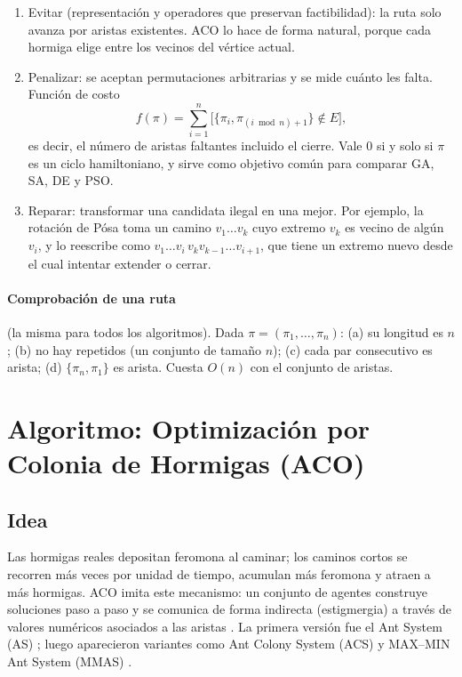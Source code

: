 \begin{enumerate}
  \item Evitar (representación y operadores que preservan factibilidad): la ruta
        solo avanza por aristas existentes. ACO lo hace de forma natural, porque cada
        hormiga elige entre los vecinos del vértice actual.
  \item Penalizar: se aceptan permutaciones arbitrarias y se mide cuánto les falta.
        \prop{} Función de costo
        \[
          f(\pi)=\sum_{i=1}^{n}\bigl[\{\pi_i,\pi_{(i \bmod n)+1}\}\notin E\bigr],
        \]
        es decir, el número de aristas faltantes incluido el cierre. Vale $0$ si y solo si
        $\pi$ es un ciclo hamiltoniano, y sirve como objetivo común para comparar GA, SA, DE
        y PSO.
  \item Reparar: transformar una candidata ilegal en una mejor. Por ejemplo, la
        rotación de Pósa \cite{aco10} toma un camino $v_1\dots v_k$ cuyo extremo $v_k$ es vecino
        de algún $v_i$, y lo reescribe como $v_1\dots v_i\,v_k v_{k-1}\dots v_{i+1}$, que tiene
        un extremo nuevo desde el cual intentar extender o cerrar.
\end{enumerate}

\paragraph{Comprobación de una ruta} (la misma para todos los algoritmos). Dada
$\pi=(\pi_1,\dots,\pi_n)$: (a) su longitud es $n$; (b) no hay repetidos (un conjunto de
tamaño $n$); (c) cada par consecutivo es arista; (d) $\{\pi_n,\pi_1\}$ es arista. Cuesta
$O(n)$ con el conjunto de aristas.

\section{Algoritmo: Optimización por Colonia de Hormigas (ACO)}

\subsection{Idea}

Las hormigas reales depositan feromona al caminar; los caminos cortos se recorren más
veces por unidad de tiempo, acumulan más feromona y atraen a más hormigas. ACO imita este
mecanismo: un conjunto de agentes construye soluciones paso a paso y se comunica de forma
indirecta (estigmergia) a través de valores numéricos asociados a las aristas
\cite{aco1,aco3}. La primera versión fue el Ant System (AS) \cite{aco1}; luego aparecieron variantes
como Ant Colony System (ACS) \cite{aco2} y MAX--MIN Ant System (MMAS) \cite{aco3,aco13}.

